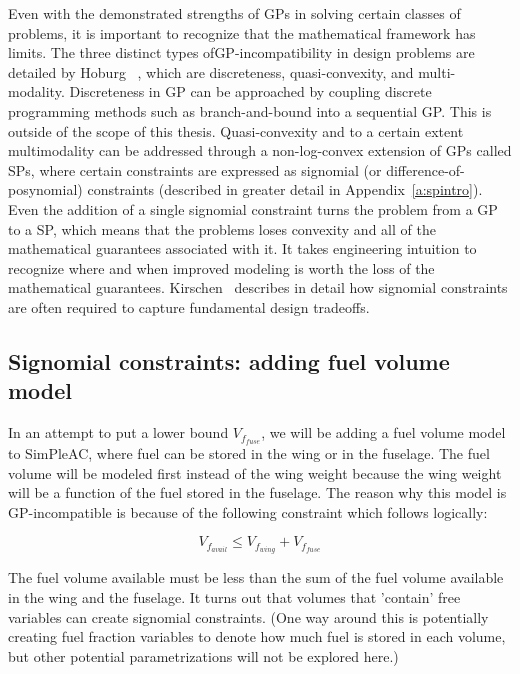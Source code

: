 Even with the demonstrated strengths of \gls{GP}s in solving certain classes of
problems, it is important to recognize that the mathematical framework has limits.
The three distinct types of\gls{GP}-incompatibility in design problems are detailed
by Hoburg~ \cite{hoburg_thesis}, which are discreteness,
quasi-convexity, and multi-modality. Discreteness in \gls{GP} can be approached
by coupling discrete programming methods such as branch-and-bound into a sequential
\gls{GP}. This is outside of the scope of this thesis.
Quasi-convexity and to a certain extent multimodality can
be addressed through a non-log-convex extension of \gls{GP}s called \gls{SP}s, where
certain constraints are expressed as signomial (or difference-of-posynomial) constraints
(described in greater detail in Appendix~\ref{a:spintro}).
Even the addition of a single
signomial constraint turns the problem from a \gls{GP} to a \gls{SP}, which means
that the problems loses convexity and all of the mathematical guarantees associated with it. 
It takes engineering intuition to recognize where and when improved modeling is worth
the loss of the mathematical guarantees. Kirschen~\cite{kirschen_thesis} describes in detail how
signomial constraints are often required to capture fundamental design tradeoffs.

\subsection{Signomial constraints: adding fuel volume model}
\label{s:fuel}

In an attempt to put a lower bound $V_{f_{fuse}}$, we will
be adding a fuel volume model to SimPleAC, where fuel can be stored in the wing or
in the fuselage. The fuel volume will be modeled first instead of the wing
weight because the wing weight will be a function of the fuel stored in the fuselage.
The reason why this model is \gls{GP}-incompatible is because of the
following constraint which follows logically:

\begin{equation}
	V_{f_{avail}} \leq V_{f_{wing}} + V_{f_{fuse}}
	\label{vfavail}
\end{equation}

The fuel volume available must be less than the sum of the fuel volume available in the
wing and the fuselage. It turns out that volumes that 'contain' free variables
can create signomial constraints. (One way around this is potentially creating fuel
fraction variables to denote how much fuel is stored in each volume, but
other potential parametrizations will not be explored here.)

